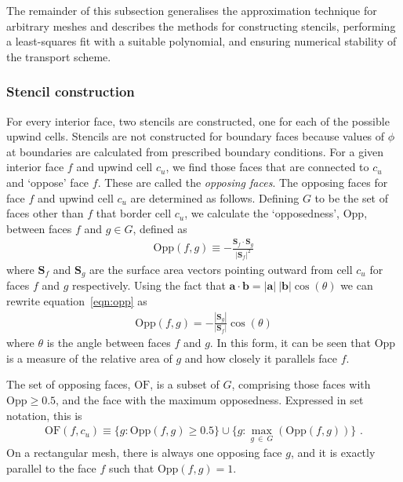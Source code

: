 The remainder of this subsection generalises the approximation technique for arbitrary meshes and describes the methods for constructing stencils, performing a least-squares fit with a suitable polynomial, and ensuring numerical stability of the transport scheme.

\subsubsection{Stencil construction}
\label{sec:stencil}

For every interior face, two stencils are constructed, one for each of the possible upwind cells.
Stencils are not constructed for boundary faces because values of $\phi$ at boundaries are calculated from prescribed boundary conditions.
For a given interior face $f$ and upwind cell $c_u$, we find those faces that are connected to $c_u$ and `oppose' face $f$.  These are called the \textit{opposing faces}.
The opposing faces for face $f$ and upwind cell $c_u$ are determined as follows.
Defining $G$ to be the set of faces other than $f$ that border cell $c_u$, we calculate the `opposedness', $\mathrm{Opp}$, between faces $f$ and $g \in G$, defined as
\begin{align}
	\mathrm{Opp}(f, g) \equiv - \frac{\mathbf{S}_f \cdot \mathbf{S}_g}{|\mathbf{S}_f|^2} \label{eqn:opp}
\end{align}
where $\mathbf{S}_f$ and $\mathbf{S}_g$ are the surface area vectors pointing outward from cell $c_u$ for faces $f$ and $g$ respectively.
Using the fact that $\mathbf{a} \cdot \mathbf{b} = |\mathbf{a}|\:|\mathbf{b}| \cos(\theta)$ we can rewrite equation~\eqref{eqn:opp} as
\begin{align}
	\mathrm{Opp}(f, g) = - \frac{|\mathbf{S}_g|}{|\mathbf{S}_f|} \cos(\theta)
\end{align}
where $\theta$ is the angle between faces $f$ and $g$.  In this form, it can be seen that $\mathrm{Opp}$ is a measure of the relative area of $g$ and how closely it parallels face $f$.

The set of opposing faces, $\mathrm{OF}$, is a subset of $G$, comprising those faces with $\mathrm{Opp} \geq 0.5$, and the face with the maximum opposedness.  Expressed in set notation, this is
\begin{align}
	\mathrm{OF}(f,c_u) \equiv \{ g : \mathrm{Opp}(f, g) \geq 0.5 \} \cup \{ g : \max_{g\:\in\:G}(\mathrm{Opp}(f, g)) \} \text{ .}
\end{align}
On a rectangular mesh, there is always one opposing face $g$, and it is exactly parallel to the face $f$ such that $\mathrm{Opp}(f, g) = 1$.

